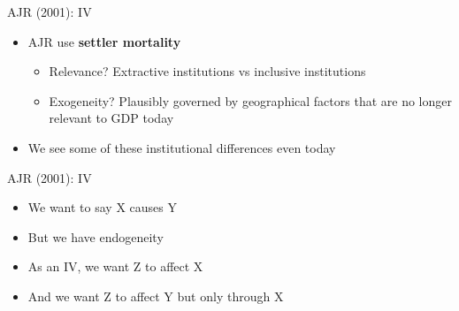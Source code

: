 \documentclass[11pt,notes=hide,aspectratio=169,mathserif]{beamer}
\begin{document}
\begin{frame}{AJR (2001): IV}
\begin{itemize}
\item AJR use \textbf{settler mortality}
\begin{itemize}
    \item Relevance? \pause Extractive institutions vs inclusive institutions
    \item Exogeneity? \pause Plausibly governed by geographical factors that are no longer relevant to GDP today
\end{itemize}
\item We see some of these institutional differences even today
\end{itemize}
\end{frame}

\begin{frame}{AJR (2001): IV}
    \begin{center}
        \end{center}
        
\begin{itemize}
    \item We want to say X causes Y
    \item But we have endogeneity
    \item As an IV, we want Z to affect X 
    \item And we want Z to affect Y but only through X
\end{itemize}
\end{frame}
\end{document}

